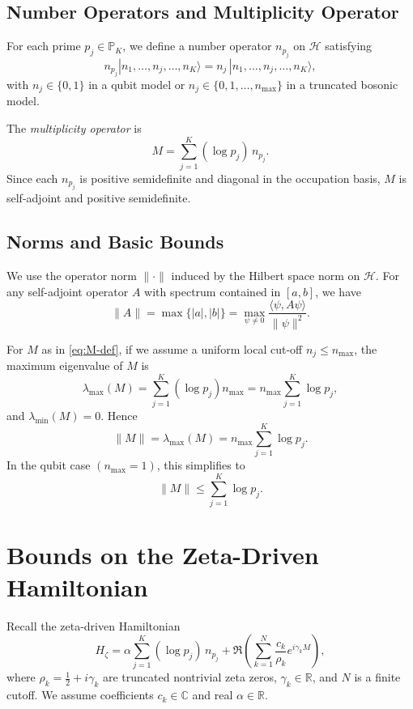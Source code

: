\documentclass[11pt]{article}
\begin{document}
\subsection{Number Operators and Multiplicity Operator}

For each prime \(p_j \in \mathbb{P}_K\), we define a number operator \(n_{p_j}\) on \(\mathcal{H}\) satisfying
\[
n_{p_j} |n_1, \dots, n_j, \dots, n_K\rangle = n_j\, |n_1, \dots, n_j, \dots, n_K\rangle,
\]
with \(n_j \in \{0, 1\}\) in a qubit model or \(n_j \in \{0, 1, \dots, n_{\max}\}\) in a truncated bosonic model.

The \emph{multiplicity operator} is
\begin{equation}
  M = \sum_{j=1}^K (\log p_j)\, n_{p_j}.  \label{eq:M-def}
\end{equation}
Since each \(n_{p_j}\) is positive semidefinite and diagonal in the occupation basis, \(M\) is self-adjoint and positive semidefinite.

\subsection{Norms and Basic Bounds}

We use the operator norm \(\|\cdot\|\) induced by the Hilbert space norm on \(\mathcal{H}\). For any self-adjoint operator \(A\) with spectrum contained in \([a, b]\), we have
\[
\|A\| = \max\{|a|, |b|\} = \max_{\psi \neq 0} \frac{\langle\psi, A\psi\rangle}{\|\psi\|^2}.
\]

For \(M\) as in \eqref{eq:M-def}, if we assume a uniform local cut-off \(n_j \le n_{\max}\), the maximum eigenvalue of \(M\) is
\begin{equation}
  \lambda_{\max}(M)
  = \sum_{j=1}^K (\log p_j) n_{\max}
  = n_{\max} \sum_{j=1}^K \log p_j,                                  \label{eq:M-lambda-max}
\end{equation}
and \(\lambda_{\min}(M) = 0\). Hence
\begin{equation}
  \|M\| = \lambda_{\max}(M) = n_{\max} \sum_{j=1}^K \log p_j.        \label{eq:M-norm-bound}
\end{equation}
In the qubit case \((n_{\max} = 1)\), this simplifies to
\[
\|M\| \le \sum_{j=1}^K \log p_j.
\]

\section{Bounds on the Zeta-Driven Hamiltonian}

Recall the zeta-driven Hamiltonian
\begin{equation}
  H_\zeta
  = \alpha \sum_{j=1}^K (\log p_j)\, n_{p_j}
    + \Re\!\left( \sum_{k=1}^N \frac{c_k}{\rho_k} e^{i \gamma_k M} \right), \label{eq:Hzeta}
\end{equation}
where \(\rho_k = \frac{1}{2} + i\gamma_k\) are truncated nontrivial zeta zeros, \(\gamma_k \in \mathbb{R}\), and \(N\) is a finite cutoff. We assume coefficients \(c_k \in \mathbb{C}\) and real \(\alpha \in \mathbb{R}\).
\end{document}
